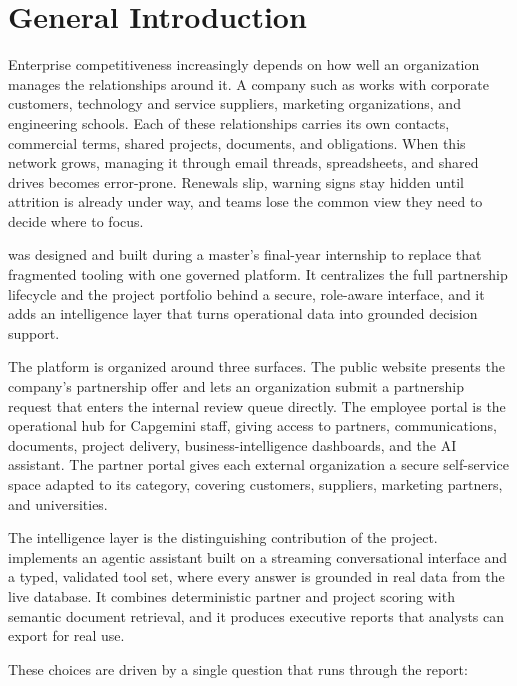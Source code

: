 \chapter*{General Introduction}

\noindent
Enterprise competitiveness increasingly depends on how well an organization manages the relationships around it. A company such as \reportcompany{} works with corporate customers, technology and service suppliers, marketing organizations, and engineering schools. Each of these relationships carries its own contacts, commercial terms, shared projects, documents, and obligations. When this network grows, managing it through email threads, spreadsheets, and shared drives becomes error-prone. Renewals slip, warning signs stay hidden until attrition is already under way, and teams lose the common view they need to decide where to focus.

\projectname{} was designed and built during a master's final-year internship to replace that fragmented tooling with one governed platform. It centralizes the full partnership lifecycle and the project portfolio behind a secure, role-aware interface, and it adds an intelligence layer that turns operational data into grounded decision support.

\medskip

The platform is organized around three surfaces. The public website presents the company's partnership offer and lets an organization submit a partnership request that enters the internal review queue directly. The employee portal is the operational hub for Capgemini staff, giving access to partners, communications, documents, project delivery, business-intelligence dashboards, and the AI assistant. The partner portal gives each external organization a secure self-service space adapted to its category, covering customers, suppliers, marketing partners, and universities.

The intelligence layer is the distinguishing contribution of the project. \projectname{} implements an agentic assistant built on a streaming conversational interface and a typed, validated tool set, where every answer is grounded in real data from the live database. It combines deterministic partner and project scoring with semantic document retrieval, and it produces executive reports that analysts can export for real use.

\medskip

These choices are driven by a single question that runs through the report:

